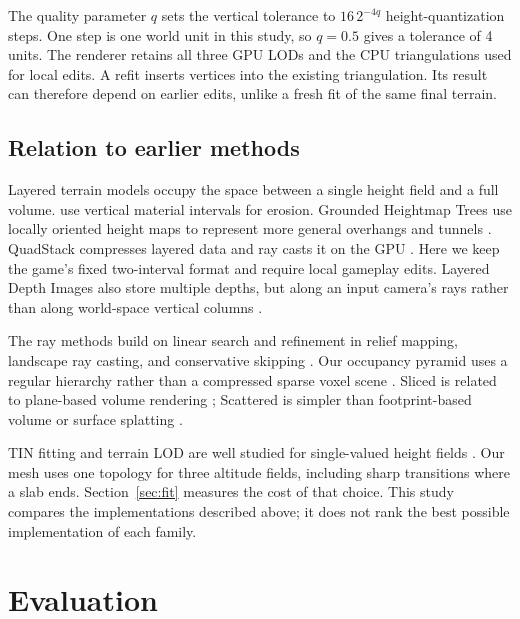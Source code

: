\documentclass{jcgt}
\begin{document}
The quality parameter $q$ sets the vertical tolerance to $16\,2^{-4q}$ height-quantization steps. One step is one world unit in this study, so $q=0.5$ gives a tolerance of 4 units. The renderer retains all three GPU LODs and the CPU triangulations used for local edits. A refit inserts vertices into the existing triangulation. Its result can therefore depend on earlier edits, unlike a fresh fit of the same final terrain.

\subsection{Relation to earlier methods}\label{sec:related}

Layered terrain models occupy the space between a single height field and a full volume. \citet{benes2001layered} use vertical material intervals for erosion. Grounded Heightmap Trees use locally oriented height maps to represent more general overhangs and tunnels \citep{alonso2008grounded}. QuadStack compresses layered data and ray casts it on the GPU \citep{graciano2021quadstack}. Here we keep the game's fixed two-interval format and require local gameplay edits. Layered Depth Images also store multiple depths, but along an input camera's rays rather than along world-space vertical columns \citep{shade1998ldi}.

The ray methods build on linear search and refinement in relief mapping, landscape ray casting, and conservative skipping \citep{policarpo2005relief,mantler2006landscape,tevs2008maximum}. Our occupancy pyramid uses a regular hierarchy rather than a compressed sparse voxel scene \citep{laine2010svo}. Sliced is related to plane-based volume rendering \citep{cabral1994volume}; Scattered is simpler than footprint-based volume or surface splatting \citep{westover1990footprint,zwicker2001splatting}.

TIN fitting and terrain LOD are well studied for single-valued height fields \citep{fowler1979tin,garland1995terrain,duchaineau1997roam,losasso2004clipmaps}. Our mesh uses one topology for three altitude fields, including sharp transitions where a slab ends. Section~\ref{sec:fit} measures the cost of that choice. This study compares the implementations described above; it does not rank the best possible implementation of each family.

\FloatBarrier
\section{Evaluation}\label{sec:eval}
\end{document}
